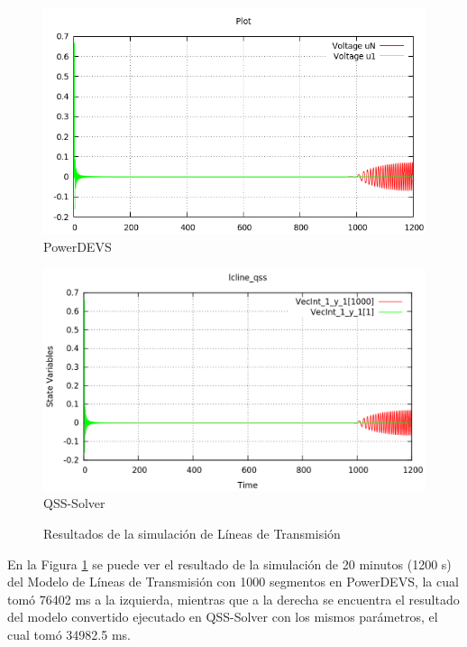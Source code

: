 \begin{figure}[H]
\centering
\begin{minipage}{0.5\textwidth}
\includegraphics[width=\linewidth]{lcline-pd}
PowerDEVS\\
\end{minipage}\hfill
\begin{minipage}{0.5\textwidth}
 \includegraphics[width=\linewidth]{lcline-qss}
QSS-Solver\\
\end{minipage}
\caption{Resultados de la simulación de Líneas de Transmisión}
\label{graph:lclines}
\end{figure}

En la Figura \ref{graph:lclines} se puede ver el resultado de la simulación de 20 minutos (1200 s) del Modelo de Líneas de Transmisión con 1000 segmentos en PowerDEVS,
	la cual tomó 76402 ms a la izquierda, mientras que a la derecha se encuentra el resultado del modelo convertido ejecutado en QSS-Solver con los mismos 
	parámetros, el cual tomó 34982.5 ms.

